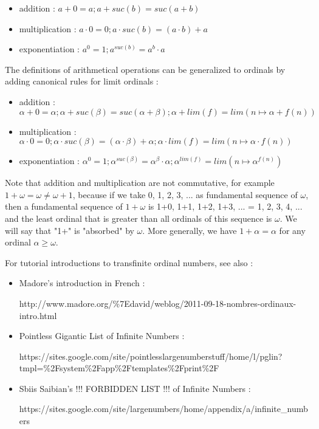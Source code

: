 \documentclass[10pt]{article}
\begin{document}
\begin{itemize}
     \setlength{\itemsep}{1pt}
     \setlength{\parskip}{0pt}
     \setlength{\parsep}{0pt}
\item addition : \( a+0=a ; a+suc(b)=suc(a+b) \)
\item multiplication : \( a \cdot 0 = 0 ; a \cdot suc(b) = (a \cdot b) + a \)
\item exponentiation : \( a^0 = 1 ; a^{suc(b)} = a^b \cdot a  \)
\end{itemize}

The definitions of arithmetical operations can be generalized to ordinals by adding canonical rules for limit ordinals :

\begin{itemize}
     \setlength{\itemsep}{1pt}
     \setlength{\parskip}{0pt}
     \setlength{\parsep}{0pt}
\item addition : \( \alpha+0=\alpha ; \alpha+suc(\beta)=suc(\alpha+\beta); \alpha+lim(f)=lim(n \mapsto \alpha+f(n)) \)
\item multiplication : \( \alpha \cdot 0 = 0 ; \alpha \cdot suc(\beta) = (\alpha \cdot \beta) + \alpha ; \alpha \cdot lim(f) = lim (n \mapsto \alpha \cdot f(n)) \)
\item exponentiation : \( \alpha^0 = 1 ; \alpha^{suc(\beta)} = \alpha^\beta \cdot \alpha ; \alpha^{lim(f)} = lim (n \mapsto \alpha^{f(n)}) \)
\end{itemize}

Note that addition and multiplication are not commutative, for example \( 1+\omega = \omega \neq \omega+1 \), because if we take 0, 1, 2, 3, ... as fundamental sequence of \( \omega \), then a fundamental sequence of \( 1+\omega \) is 1+0, 1+1, 1+2, 1+3, ... = 1, 2, 3, 4, ... and the least ordinal that is greater than all ordinals of this sequence is \( \omega \). We will say that "1+" is "absorbed" by \( \omega \). More generally, we have \( 1+\alpha = \alpha \) for any ordinal \( \alpha \geq \omega \).

\bigskip

For tutorial introductions to transfinite ordinal numbers, see also :

\begin{itemize}
     \setlength{\itemsep}{1pt}
     \setlength{\parskip}{0pt}
     \setlength{\parsep}{0pt}

\item Madore's introduction in French : 

 http://www.madore.org/\%7Edavid/weblog/2011-09-18-nombres-ordinaux-intro.html

\item Pointless Gigantic List of Infinite Numbers : 

 https://sites.google.com/site/pointlesslargenumberstuff/home/l/pglin?tmpl=\%2Fsystem\%2Fapp\%2Ftemplates\%2Fprint\%2F

\item Sbiis Saibian's !!! FORBIDDEN LIST !!! of Infinite Numbers : 

 https://sites.google.com/site/largenumbers/home/appendix/a/infinite\_numbers



\end{itemize}
\end{document}
